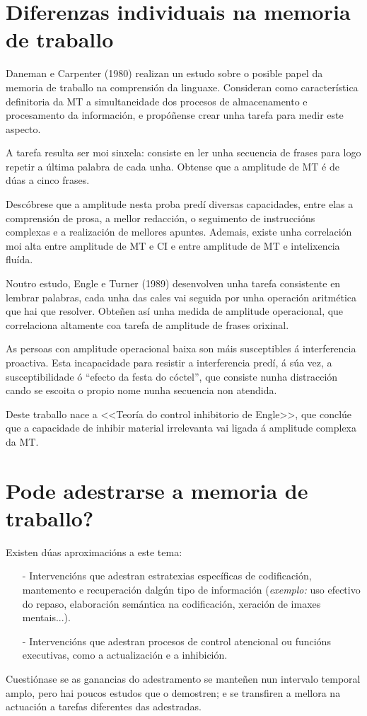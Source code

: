 \documentclass[a4paper,11pt]{article}
\begin{document}
\section{Diferenzas individuais na memoria de traballo}
Daneman e Carpenter (1980) realizan un estudo sobre o posible papel da memoria de traballo na comprensión da linguaxe. Consideran como característica definitoria da MT a simultaneidade dos procesos de almacenamento e procesamento da información, e propóñense crear unha tarefa para medir este aspecto.

A tarefa resulta ser moi sinxela: consiste en ler unha secuencia de frases para logo repetir a última palabra de cada unha. Obtense que a amplitude de MT é de dúas a cinco frases.

Descóbrese que a amplitude nesta proba predí diversas capacidades, entre elas a comprensión de prosa, a mellor redacción, o seguimento de instruccións complexas e a realización de mellores apuntes. Ademais, existe unha correlación moi alta entre amplitude de MT e CI e entre amplitude de MT e intelixencia fluída.

Noutro estudo, Engle e Turner (1989) desenvolven unha tarefa consistente en lembrar palabras, cada unha das cales vai seguida por unha operación aritmética que hai que resolver. Obteñen así unha medida de amplitude operacional, que correlaciona altamente coa tarefa de amplitude de frases orixinal.

As persoas con amplitude operacional baixa son máis susceptibles á interferencia proactiva. Esta incapacidade para resistir a interferencia predí, á súa vez, a susceptibilidade ó ``efecto da festa do cóctel'', que consiste nunha distracción cando se escoita o propio nome nunha secuencia non atendida.

Deste traballo nace a <<Teoría do control inhibitorio de Engle>>, que conclúe que a capacidade de inhibir material irrelevanta vai ligada á amplitude complexa da MT. 

\section{Pode adestrarse a memoria de traballo?}
Existen dúas aproximacións a este tema:
\begin{itemize}
	\item[-] Intervencións que adestran estratexias específicas de codificación, mantemento e
	recuperación dalgún tipo de información (\textit{exemplo:} uso efectivo do repaso, elaboración
	semántica na codificación, xeración de imaxes mentais...).
	\item[-] Intervencións que adestran procesos de control atencional ou funcións executivas, como a
	actualización e a inhibición. 
\end{itemize}

Cuestiónase se as ganancias do adestramento se manteñen nun intervalo temporal amplo, pero hai poucos estudos que o demostren; e se transfiren a mellora na actuación a tarefas diferentes das adestradas.
\end{document}
